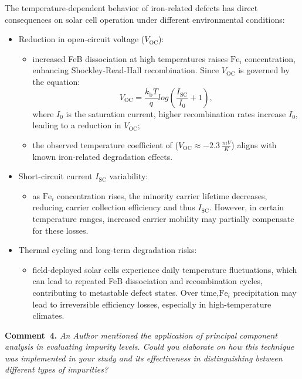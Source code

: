 \documentclass[a4paper,fleqn]{cas-sc}
\begin{document}
The temperature-dependent behavior of iron-related defects has direct consequences on solar cell operation under different environmental conditions:
\begin{itemize}
    \item Reduction in open-circuit voltage ($V_\mathrm{OC}$):
    \begin{itemize}
        \item increased FeB dissociation at high temperatures raises $\mathrm{Fe}_i$ concentration, enhancing Shockley-Read-Hall recombination. Since $V_\mathrm{OC}$ is governed by the equation:
        \begin{equation}
        \label{eq3}
             V_\mathrm{OC} = \frac{k_\mathrm{b}T}{q} log\left(\frac{I_\mathrm{SC}}{I_\mathrm{0}} + 1\right),
        \end{equation}
        where $I_\mathrm{0}$ is the saturation current, higher recombination rates increase $I_\mathrm{0}$, leading to a reduction in $V_\mathrm{OC}$;
        \item the observed temperature coefficient of ($V_\mathrm{OC} \approx -2.3~\frac{mV}{K}$) aligns with known iron-related degradation effects.
    \end{itemize}
    \item Short-circuit current $I_\mathrm{SC}$ variability:
    \begin{itemize}
        \item as $\mathrm{Fe}_i$ concentration rises, the minority carrier lifetime decreases, reducing carrier collection efficiency and thus $I_\mathrm{SC}$. However, in certain temperature ranges, increased carrier mobility may partially compensate for these losses.
     \end{itemize}
     \item Thermal cycling and long-term degradation risks:
     \begin{itemize}
        \item field-deployed solar cells experience daily temperature fluctuations, which can lead to repeated FeB dissociation and recombination cycles, contributing to metastable defect states. Over time,$\mathrm{Fe}_i$ precipitation may lead to irreversible efficiency losses, especially in high-temperature climates.
     \end{itemize}
\end{itemize}

\vspace{1cm}
\noindent
\textcolor[rgb]{0.00,0.50,1.00}{\textbf{Comment~4.}}
\emph{An Author mentioned the application of principal component analysis in evaluating impurity levels. Could you elaborate on how this technique was implemented in your study and its effectiveness in distinguishing between different types of impurities?}
\end{document}
